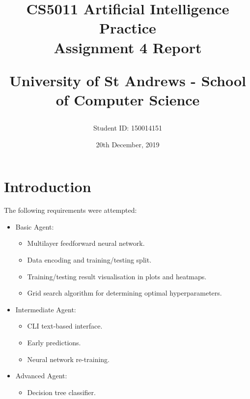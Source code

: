 \documentclass[letterpaper,12pt]{article}
\begin{document}
\title{
    CS5011 Artificial Intelligence Practice\\Assignment 4 Report\\
    \begin{large}
    University of St Andrews - School of Computer Science
    \end{large}
}
\author{Student ID: 150014151}
\date{20th December, 2019}
\maketitle
\newpage

\tableofcontents
\newpage



\section{Introduction}
\label{sec:introduction}

The following requirements were attempted:
\begin{itemize}
    \item Basic Agent:
    \begin{itemize}
        \item Multilayer feedforward neural network.
        \item Data encoding and training/testing split.
        \item Training/testing result visualisation in plots and heatmaps.
        \item Grid search algorithm for determining optimal hyperparameters.
    \end{itemize}
    \item Intermediate Agent:
    \begin{itemize}
        \item CLI text-based interface.
        \item Early predictions.
        \item Neural network re-training.
    \end{itemize}
    \item Advanced Agent:
    \begin{itemize}
        \item Decision tree classifier.
    \end{itemize}
        
\end{itemize}
\end{document}
